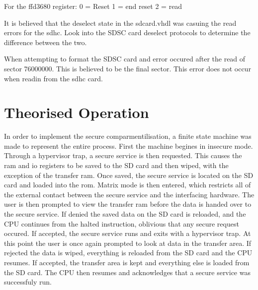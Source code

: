 For the ffd3680 register:
0 = Reset
1 = end reset
2 = read

It is believed that the deselect state in the sdcard.vhdl was casuing the read errors for the sdhc. Look into the SDSC card deselect protocols to determine the difference between the two.

When attempting to format the SDSC card and error occured after the read of sector 76000000. This is believed to be the final sector. This error does not occur when readin from the sdhc card.



\section{Theorised Operation}

\label{Ch6 Sec2}

In order to implement the secure comparmentilisation, a finite state machine was made to represent the entire process. First the machine begines in insecure mode. Through a hypervisor trap, a secure service is then requested. This causes the ram and io registers to be saved to the SD card and then wiped, with the exception of the transfer ram. Once saved, the secure service is located on the SD card and loaded into the rom. Matrix mode is then entered, which restricts all of the external contact between the secure service and the interfacing hardware. The user is then prompted to view the transfer ram before the data is handed over to the secure service. If denied the saved data on the SD card is reloaded, and the CPU continues from the halted instruction, oblivious that any secure request occured. If accepted, the secure service runs and exits with a hypervisor trap. At this point the user is once again prompted to look at data in the transfer area. If rejected the data is wiped, everything is reloaded from the SD card and the CPU resumes. If accepted, the transfer area is kept and everything else is loaded from the SD card. The CPU then resumes and acknowledges that a secure service was successfuly run.
